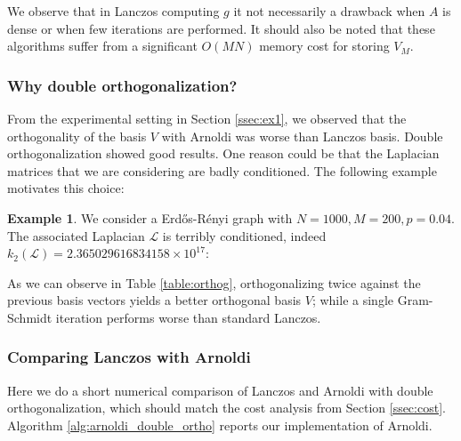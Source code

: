 \documentclass[11pt]{article}
\renewcommand{\L}{\mathcal{L}}
\theoremstyle{definition}
\newtheorem{example}[theorem]{Example}
\theoremstyle{remark}
\theoremstyle{experimental}
\begin{document}
We observe that in Lanczos computing $ g $ it not necessarily a drawback when $ A $ is dense or when few iterations are performed.
It should also be noted that these algorithms suffer from a significant $ O(M N) $ memory cost for storing $ V_M $.


\subsubsection{Why double orthogonalization?}

  From the experimental setting in Section \ref{ssec:ex1}, we observed that the orthogonality of the
  basis $ V $ with Arnoldi was worse than Lanczos basis. Double orthogonalization showed good
  results. One reason could be that the Laplacian matrices that we are considering are badly
  conditioned. The following example motivates this choice:
\begin{example}
    
We consider a Erdős-Rényi graph with $ N = 1000,M=200, p=0.04 $.
The associated Laplacian $ \L $ is terribly conditioned, indeed $ k_2(\L) = 2.365029616834158 \times 10^{17} $:
  

  \end{example}
  As we can observe in Table \ref{table:orthog}, orthogonalizing twice against the previous
  basis vectors yields a better orthogonal basis $ V$; while a single Gram-Schmidt iteration performs worse than standard Lanczos.


\subsubsection{Comparing Lanczos with Arnoldi}

Here we do a short numerical comparison of Lanczos and Arnoldi with double orthogonalization, which
should match the cost analysis from Section \ref{ssec:cost}. Algorithm
\ref{alg:arnoldi_double_ortho} reports our implementation of Arnoldi.
\end{document}
